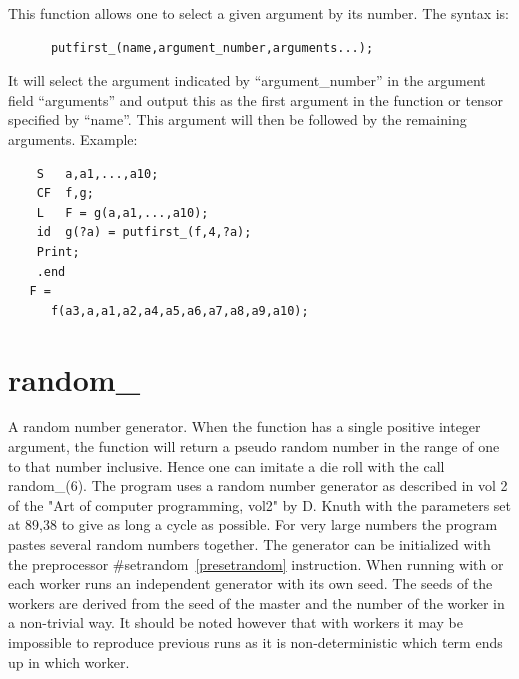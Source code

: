 \noindent 
This function allows one to select a given argument by its number. The 
syntax is:
\begin{verbatim}
      putfirst_(name,argument_number,arguments...);
\end{verbatim}
It will select the argument indicated by ``argument\_number'' in the argument
field ``arguments'' and output this as the first argument in the function or
tensor specified by ``name''.
This argument will then be followed by the remaining arguments.
Example:
\begin{verbatim}
    S   a,a1,...,a10;
    CF  f,g;
    L   F = g(a,a1,...,a10);
    id  g(?a) = putfirst_(f,4,?a);
    Print;
    .end
   F =
      f(a3,a,a1,a2,a4,a5,a6,a7,a8,a9,a10);
\end{verbatim}


\section{random\_}
\label{funrandom}
\noindent A random number generator. When the function has a single 
positive integer argument, the function will return a pseudo random number 
in the range of one to that number inclusive. Hence one can imitate a die 
roll with the call random\_(6). The program uses a random number generator 
as described in vol 2 of the "Art of computer programming, vol2" by D. 
Knuth with the parameters set at 89,38 to give as long a cycle as possible. 
For very large numbers the program pastes several random numbers together. 
The generator can be initialized with the preprocessor 
\#setrandom~\ref{presetrandom} instruction. When running 
with \TFORM{} or \ParFORM{} each worker runs an independent generator with its 
own seed. The seeds of the workers are derived from the seed of the master 
and the number of the worker in a non-trivial way. It should be noted 
however that with workers it may be impossible to reproduce previous runs 
as it is non-deterministic which term ends up in which worker.


